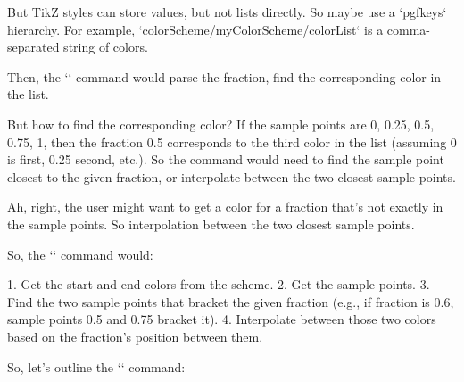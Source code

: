 But TikZ styles can store values, but not lists directly. So maybe use a `pgfkeys` hierarchy. For example, `colorScheme/myColorScheme/colorList` is a comma-separated string of colors.

Then, the `\getSchemeColor` command would parse the fraction, find the corresponding color in the list.

But how to find the corresponding color? If the sample points are 0, 0.25, 0.5, 0.75, 1, then the fraction 0.5 corresponds to the third color in the list (assuming 0 is first, 0.25 second, etc.). So the command would need to find the sample point closest to the given fraction, or interpolate between the two closest sample points.

Ah, right, the user might want to get a color for a fraction that's not exactly in the sample points. So interpolation between the two closest sample points.

So, the `\getSchemeColor` command would:

1. Get the start and end colors from the scheme.
2. Get the sample points.
3. Find the two sample points that bracket the given fraction (e.g., if fraction is 0.6, sample points 0.5 and 0.75 bracket it).
4. Interpolate between those two colors based on the fraction's position between them.

So, let's outline the `\getSchemeColor` command:

